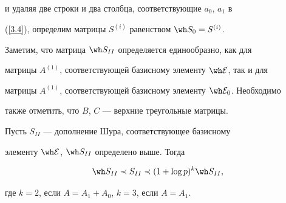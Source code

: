 и удаляя две строки и два столбца, соответствующие $a_0$, $a_1$ в


(\ref{3.4}), определим матрицы $S^{(i)}$ равенством $\wh S_0=S^{(i)}$.


Заметим, что матрица $\wh S_{II}$ определяется единообразно, как для


матрицы $A^{(1)}$, соответствующей базисному элементу $\E$, так и для


матрицы $A^{(1)}$, соответствующей базисному элементу $\E_0 $. Необходимо


также отметить, что $B$, $C$ --- верхние треугольные матрицы.





\begin{thms}


Пусть $S_{II}$ --- дополнение Шура, соответствующее базисному


элементу $\E$, $\s$ определено выше. Тогда


$$


\s\prec S_{II}\prec(1+\log p)^k\s,


$$


где $k=2$, если $A=A_1+A_0$, $k=3$, если $A=A_1$.


\end{thms}





